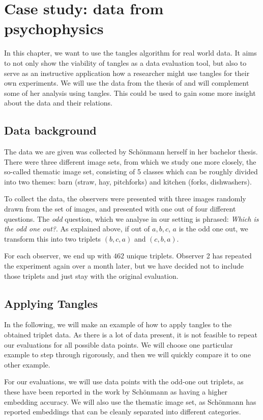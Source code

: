 \chapter{Case study: data from psychophysics}\label{real}
In this chapter, we want to use the tangles algorithm for real world data. 
It aims to not only show the viability of tangles as a data evaluation tool, but also to serve as an 
instructive application how a researcher might use tangles for their own experiments. We will use the data
from the thesis of \cite{inesschonmannSimilarityJudgementsNatural2021}
and will complement some of her analysis using tangles. This could be used to gain some more insight about the
data and their relations.

\section{Data background}
The data we are given was collected by Schönmann herself in her bachelor thesis. There were three different image sets, from which we study one more closely, the
so-called thematic image set, consisting of 5 classes which can be roughly divided into two themes: barn (straw, hay, pitchforks) and kitchen (forks, dishwashers).

To collect the data, the observers were presented with three images randomly drawn from the set of images, and presented with one out of four different questions. 
The \textit{odd} question, which we analyse in our setting is phrased: \textit{Which is the odd one out?}.  
As explained above, if out of $a,b,c$, $a$ is the odd one out, we transform this into two triplets $(b, c, a)$ and $(c, b, a)$.

For each observer, we end up with $462$ unique triplets. Observer 2 has repeated the experiment again over a month later, but we have decided not to include 
those triplets and just stay with the original evaluation.

\section{Applying Tangles}
In the following, we will make an example of how to apply tangles to the obtained triplet data.
As there is a lot of data present, it is not feasible to repeat our evaluations for all possible data points.
We will choose one particular example to step through rigorously, and then we will quickly compare it to one other example.

For our evaluations, we will use data points with the odd-one out triplets, as these have been reported in the work by Schönmann as 
having a higher embedding accuracy. We will also use the thematic image set, as Schönmann has reported embeddings that can be cleanly 
separated into different categories.


